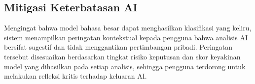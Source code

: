 \documentclass[11pt]{article}
\begin{document}
\subsection{Mitigasi Keterbatasan AI}
Mengingat bahwa model bahasa besar dapat menghasilkan klasifikasi yang keliru, sistem menampilkan peringatan kontekstual kepada pengguna bahwa analisis AI bersifat sugestif dan tidak menggantikan pertimbangan pribadi. Peringatan tersebut disesuaikan berdasarkan tingkat risiko keputusan dan skor keyakinan model yang dihasilkan pada setiap analisis, sehingga pengguna terdorong untuk melakukan refleksi kritis terhadap keluaran AI.
 
\renewcommand{\refname}{DAFTAR PUSTAKA}


 
\end{document}
